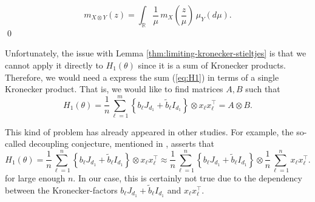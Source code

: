 \documentclass{article}
\begin{document}
\begin{equation}
m_{X\otimes Y}(z)=\int_{\mathbb{R}}\frac{1}{\mu}\,m_X\left(\frac{z}{\mu}\right)\,\mu_Y(d\mu).
\end{equation}
\qed
\bigskip
\par
Unfortunately, the issue with Lemma \ref{thm:limiting-kronecker-stieltjes} is that we cannot apply it directly to $H_1(\theta)$ since it is a sum of Kronecker products. Therefore, we would need a express the sum (\ref{eq:H1}) in terms of a single Kronecker product. That is, we would like to find matrices $A,B$ such that
\begin{equation}
H_1(\theta)=\frac{1}{n}\sum_{\ell=1}^m\left\{b_\ell J_{d_1}+\tilde{b}_\ell I_{d_1}\right\}\otimes x_\ell x_\ell^\top = A\otimes B.
\end{equation}
\par
This kind of problem has already appeared in other studies. For example, the so-called decoupling conjecture, mentioned in \cite{wu}, asserts that
\begin{equation}
H_1(\theta)=\frac{1}{n}\sum_{\ell=1}^n\left\{b_\ell J_{d_1}+\tilde{b}_\ell I_{d_1}\right\}\otimes x_\ell x_\ell^\top\approx\frac{1}{n}\sum_{\ell=1}^n\left\{b_\ell J_{d_1}+\tilde b_\ell I_{d_1}\right\}\otimes\frac{1}{n}\sum_{\ell=1}^nx_\ell x_\ell^\top.
\end{equation}
for large enough $n$. In our case, this is certainly not true due to the dependency between the Kronecker-factors $b_\ell J_{d_1}+\tilde{b}_\ell I_{d_1}$ and $x_\ell x_\ell^\top$.
\end{document}
